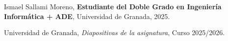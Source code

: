 \begin{thebibliography}{99}

  Ismael Sallami Moreno, \textbf{Estudiante del Doble Grado en Ingeniería Informática + ADE}, Universidad de Granada, 2025.
  
  Universidad de Granada, \emph{Diapositivas de la asignatura}, Curso 2025/2026.

  
  
  \end{thebibliography}
  